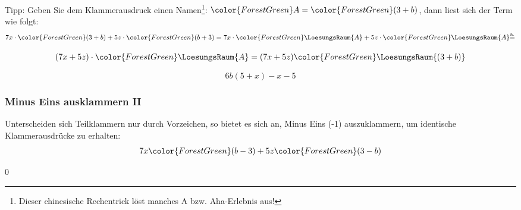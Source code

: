 Tipp: Geben Sie dem Klammerausdruck einen Namen\footnote{Dieser
chinesische Rechentrick löst manches {\color{ForestGreen}A} bzw. {\color{ForestGreen}Aha}-Erlebnis aus!}: ${\color{ForestGreen}A} = {\color{ForestGreen}(3+b)}$, dann liest sich der
Term wie folgt:
$$7x\cdot{}{\color{ForestGreen}(3+b)} + 5z\cdot{}{\color{ForestGreen}(b+3)} = 7x\cdot{\color{ForestGreen}\LoesungsRaum{A}}
+ 5z\cdot{\color{ForestGreen}\LoesungsRaum{A}} {\stackrel{\text{a.}}{=}}$$

$$(7x+5z)\cdot{\color{ForestGreen}\LoesungsRaum{A}} = (7x+5z){\color{ForestGreen}\LoesungsRaum{(3+b)}}$$

\begin{beispiel}{}{}
$$6b(5+x) - x- 5$$

\end{beispiel}






\newpage



\subsubsection{Minus Eins ausklammern II}
Unterscheiden sich Teilklammern nur durch Vorzeichen, so bietet es
sich an, Minus Eins (-1) auszuklammern, um identische Klammerausdrücke
zu erhalten:
$$7x{\color{ForestGreen}(b-3)} + 5z{\color{ForestGreen}(3-b)}$$%


0



